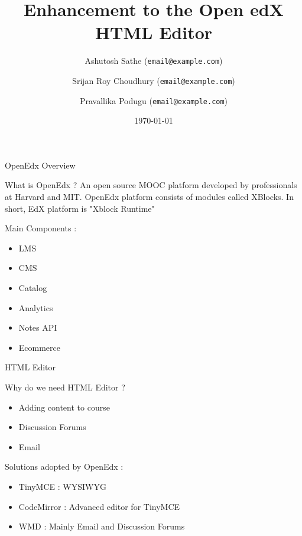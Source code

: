 \documentclass{beamer}
\title{Enhancement to the Open edX HTML Editor}
\date{\today}
\author{
	Ashutosh Sathe
	(\texttt{email@example.com}) \\
	\and
	Srijan Roy Choudhury
	(\texttt{email@example.com}) \\
	\and
	Pravallika Podugu
	(\texttt{email@example.com}) \\
}
\begin{document}
	\maketitle

	\begin{frame}{OpenEdx Overview}
		\begin{block}{What is OpenEdx ?}
			An open source MOOC platform developed by professionals at Harvard and MIT.
			OpenEdx platform consists of modules called XBlocks. In short, EdX platform is "Xblock Runtime"
		\end{block}
		\begin{block}{Main Components : }
			\begin{itemize}
				\item LMS
				\item CMS
				\item Catalog
				\item Analytics
				\item Notes API
				\item Ecommerce
			\end{itemize}
		\end{block}
	\end{frame}
	
	\begin{frame}{ HTML Editor }
		\begin{block}{Why do we need HTML Editor ?}
			\begin{itemize}
				\item Adding content to course
				\item Discussion Forums
				\item Email
			\end{itemize}
		\end{block}
		\begin{block}{Solutions adopted by OpenEdx : }
			\begin{itemize}
				\item TinyMCE : WYSIWYG
				\item CodeMirror : Advanced editor for TinyMCE
				\item WMD : Mainly Email and Discussion Forums
			\end{itemize}
		\end{block}
	\end{frame}
	
\end{document}
